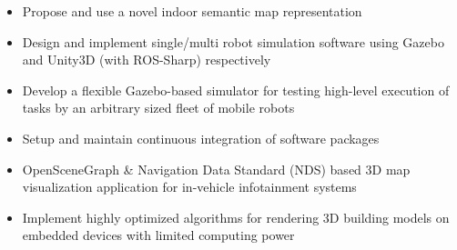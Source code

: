 \documentclass[10pt,a4paper,ragged2e]{altacv}
\begin{document}



\begin{itemize}
    \item Propose and use a novel indoor semantic map representation
    \item Design and implement single/multi robot simulation software using Gazebo and Unity3D (with ROS-Sharp) respectively
\end{itemize}

\divider

\begin{itemize}
    \item Develop a flexible Gazebo-based simulator for testing high-level execution of tasks by an arbitrary sized fleet of mobile robots
    \item Setup and maintain continuous integration of software packages
\end{itemize}

\divider

\begin{itemize}
    \item OpenSceneGraph \& Navigation Data Standard (NDS) based 3D map visualization application for in-vehicle infotainment systems
    \item Implement highly optimized algorithms for rendering 3D building models on embedded devices with limited computing power
\end{itemize}
\end{document}
